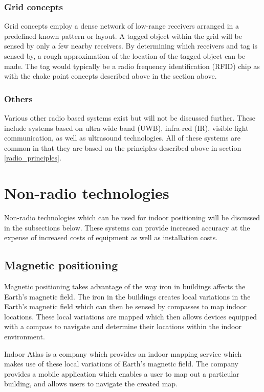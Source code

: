 \documentclass[11pt,a4paper]{report}
\begin{document}
		\subsubsection{Grid concepts}
			Grid concepts employ a dense network of low-range receivers arranged in a predefined known pattern or layout. A tagged object within the grid will be sensed by only a few nearby receivers. By determining which receivers and tag is sensed by, a rough approximation of the location of the tagged object can be made. The tag would typically be a radio frequency identification (RFID) chip as with the choke point concepts described above in the section above.
		
		\subsubsection{Others}
			Various other radio based systems exist but will not be discussed further. These include systems based on ultra-wide band (UWB), infra-red (IR), visible light communication, as well as ultrasound technologies. All of these systems are common in that they are based on the principles described above in section \ref{radio_principles}.
	
	\section{Non-radio technologies}
		Non-radio technologies which can be used for indoor positioning will be discussed in the subsections below. These systems can provide increased accuracy at the expense of increased costs of equipment as well as installation costs.
	
	\subsection{Magnetic positioning}
		Magnetic positioning takes advantage of the way iron in buildings affects the Earth's magnetic field. The iron in the buildings creates local variations in the Earth's magnetic field which can then be sensed by compasses to map indoor locations. These local variations are mapped which then allows devices equipped with a compass to navigate and determine their locations within the indoor environment.
		\parencite{supreeth_sudhakaran_geospatial_2014}
		
		Indoor Atlas is a company which provides an indoor mapping service which makes use of these local variations of Earth's magnetic field. The company provides a mobile application which enables a user to map out a particular building, and allows users to navigate the created map.
	
\end{document}
